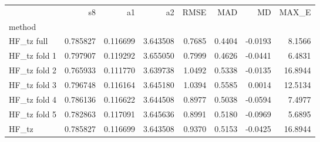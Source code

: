 \begin{tabular}{lrrrrrrr}
 & s8 & a1 & a2 & RMSE & MAD & MD & MAX_E \\
method &  &  &  &  &  &  &  \\
HF_tz full & 0.785827 & 0.116699 & 3.643508 & 0.7685 & 0.4404 & -0.0193 & 8.1566 \\
HF_tz fold 1 & 0.797907 & 0.119292 & 3.655050 & 0.7999 & 0.4626 & -0.0441 & 6.4831 \\
HF_tz fold 2 & 0.765933 & 0.111770 & 3.639738 & 1.0492 & 0.5338 & -0.0135 & 16.8944 \\
HF_tz fold 3 & 0.796748 & 0.116164 & 3.645180 & 1.0394 & 0.5585 & 0.0014 & 12.5134 \\
HF_tz fold 4 & 0.786136 & 0.116622 & 3.644508 & 0.8977 & 0.5038 & -0.0594 & 7.4977 \\
HF_tz fold 5 & 0.782863 & 0.117091 & 3.645636 & 0.8991 & 0.5180 & -0.0969 & 5.6895 \\
HF_tz & 0.785827 & 0.116699 & 3.643508 & 0.9370 & 0.5153 & -0.0425 & 16.8944 \\
\end{tabular}
